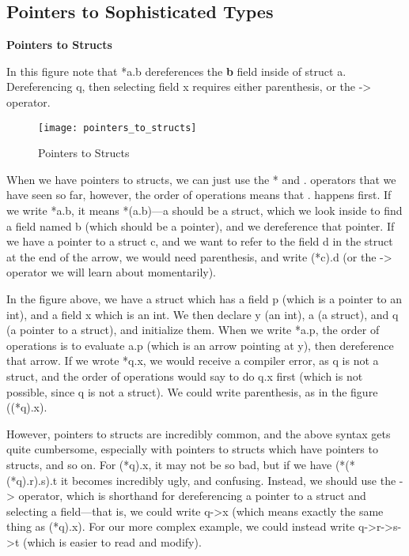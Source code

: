\documentclass[11pt, a4paper]{article}
\begin{document}
\subsection{Pointers to Sophisticated Types}%
\label{ssub:pointers_to_sophisticated_types}


\textbf{Pointers to Structs}


In this figure note that *a.b dereferences the \textbf{b} field inside of struct a. Dereferencing q, then selecting field x requires either parenthesis, or the -> operator.


\begin{figure}[htpb]
  \centering
  \texttt{[image: pointers\_to\_structs]}
  \caption{Pointers to Structs}
  \label{fig:pointers_to_strucs}
\end{figure}


When we have pointers to structs, we can just use the * and . operators that we have seen so far, however, the order of operations means that . happens first. If we write *a.b, it means *(a.b)—a should be a struct, which we look inside to find a field named b (which should be a pointer), and we dereference that pointer. If we have a pointer to a struct c, and we want to refer to the field d in the struct at the end of the arrow, we would need parenthesis, and write (*c).d (or the -> operator we will learn about momentarily).

In the figure above, we have a struct which has a field p (which is a pointer to an int), and a field x which is an int. We then declare y (an int), a (a struct), and q (a pointer to a struct), and initialize them. When we write *a.p, the order of operations is to evaluate a.p (which is an arrow pointing at y), then dereference that arrow. If we wrote *q.x, we would receive a compiler error, as q is not a struct, and the order of operations would say to do q.x first (which is not possible, since q is not a struct). We could write parenthesis, as in the figure ((*q).x).

However, pointers to structs are incredibly common, and the above syntax gets quite cumbersome, especially with pointers to structs which have pointers to structs, and so on. For (*q).x, it may not be so bad, but if we have (*(*(*q).r).s).t it becomes incredibly ugly, and confusing. Instead, we should use the -> operator, which is shorthand for dereferencing a pointer to a struct and selecting a field—that is, we could write q->x (which means exactly the same thing as (*q).x). For our more complex example, we could instead write q->r->s->t (which is easier to read and modify).
\end{document}
